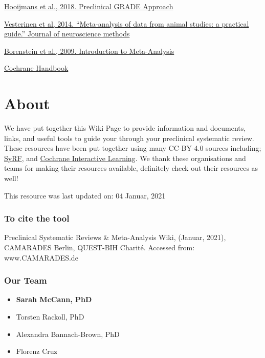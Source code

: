 \documentclass[
]{book}
\providecommand{\tightlist}{%
  \setlength{\itemsep}{0pt}\setlength{\parskip}{0pt}}
\begin{document}
\href{https://journals.plos.org/plosone/article?id=10.1371/journal.pone.0187271}{Hooijmans et al., 2018. Preclinical GRADE Approach}

\href{https://doi.org/10.1016/j.jneumeth.2013.09.010}{Vesterinen et al, 2014. ``Meta-analysis of data from animal studies: a practical guide.'' Journal of neuroscience methods}

\href{https://doi.org/10.1002/9780470743386}{Borenstein et al., 2009. Introduction to Meta-Analysis}

\href{https://handbook-5-1.cochrane.org/}{Cochrane Handbook}

\hypertarget{about}{%
\chapter{About}\label{about}}

We have put together this Wiki Page to provide information and documents, links, and useful tools to guide your through your preclinical systematic review. These resources have been put together using many CC-BY-4.0 sources including; \href{http://syrf.org.uk/}{SyRF}, and \href{https://training.cochrane.org/interactivelearning}{Cochrane Interactive Learning}. We thank these organisations and teams for making their resources available, definitely check out their resources as well!

This resource was last updated on: 04 Januar, 2021

\hypertarget{to-cite-the-tool}{%
\subsection{To cite the tool}\label{to-cite-the-tool}}

Preclinical Systematic Reviews \& Meta-Analysis Wiki, (Januar, 2021), CAMARADES Berlin, QUEST-BIH Charité. Accessed from: www.CAMARADES.de

\hypertarget{our-team}{%
\subsection{Our Team}\label{our-team}}

\begin{itemize}
\tightlist
\item
  \textbf{Sarah McCann, PhD}
\item
  Torsten Rackoll, PhD
\item
  Alexandra Bannach-Brown, PhD
\item
  Florenz Cruz
\end{itemize}
\end{document}
